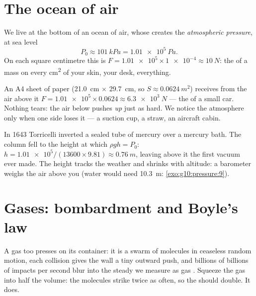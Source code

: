 \section{The ocean of air}

\begin{definition}\label{def:g10:pressure:atmospheric}
We live at the bottom of an ocean of air, whose  creates the
\emph{atmospheric pressure}, at sea level
\[
P_0 \approx \qty{101}{kPa} = \qty{1.01e5}{Pa}.
\]
On each square centimetre this is $F = \num{1.01e5} \times \num{1e-4}
\approx \qty{10}{N}$: the  of a  mass on every
\unit{cm^2} of your skin, your desk, everything.
\end{definition}

\begin{example}\label{ex:g10:pressure:sheet}
An A4 sheet of paper (\qty{21.0}{cm} $\times$ \qty{29.7}{cm}, so
$S \approx \qty{0.0624}{m^2}$) receives from the air above it
$F = \num{1.01e5} \times 0.0624 \approx \qty{6.3e3}{N}$ --- the 
of a small car. Nothing tears: the air below pushes
\emph{up} just as hard. We notice the atmosphere only when one side
loses it --- a suction cup, a straw, an aircraft cabin.
\end{example}

\begin{remark}\label{rem:g10:pressure:torricelli}
In 1643 Torricelli inverted a sealed tube of mercury over a mercury
bath. The column fell to the height at which $\rho g h = P_0$:
$h = \num{1.01e5}/(13600 \times 9.81) \approx \qty{0.76}{m}$, leaving
above it the first vacuum ever made. The height tracks the weather and
shrinks with altitude: a barometer weighs the air above you (water
would need \qty{10.3}{m}: \cref{exo:g10:pressure:9}).
\end{remark}

\section{Gases: bombardment and Boyle's law}

A gas too presses on its container: it is a swarm of molecules in
ceaseless random motion, each collision gives the wall a tiny outward
push, and billions of billions of impacts per second blur into the
steady  we measure as gas . Squeeze the gas into half the
volume: the molecules strike twice as often, so the  should
double. It does.

